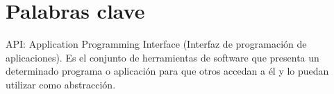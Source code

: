 \documentclass[12pt,a4paper,oneside]{book}
\begin{document}











\chapter*{Palabras clave}

API: Application Programming Interface (Interfaz de programación de aplicaciones). Es el conjunto de herramientas de software que presenta un determinado programa o aplicación para que otros accedan a él y lo puedan utilizar como abstracción.
\end{document}
